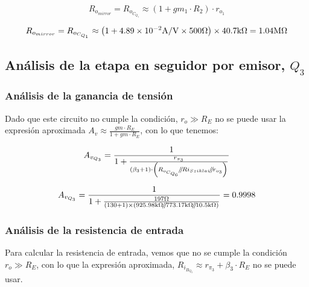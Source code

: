 \begin{equation}
R_{o_{mirror}} = R_{o_{C_{Q_{1}}}} \approx \left( 1 + gm_{1} \cdot R_{2} \right) \cdot r_{o_{1}}
\end{equation} 

\begin{equation*}
R_{o_{mirror}} = R_{o_{C_{Q_{1}}}} \approx \left( 1 + \num{4.89E-2} \si[per-mode=symbol]{\ampere\per\volt}  \times 500 \si[per-mode=symbol]{\ohm}  \right) \times 40.7 \si[per-mode=symbol]{\kilo\ohm} = 1.04 \si[per-mode=symbol]{\mega\ohm}
\end{equation*} 

\subsection{Análisis de la etapa en seguidor por emisor, $Q_{3}$}


\subsubsection{Análisis de la ganancia de tensión}

Dado que este circuito no cumple la condición, $r_{o} \gg R_{E}$ no se puede usar la expresión aproximada $A_{v} \approx \frac{gm \cdot R_{E}}{1 + gm \cdot R_{E}}$, con lo que tenemos:

\begin{equation}
A_{v_{Q_{3}}} = \frac{1}{1 + \frac{r_{\pi_{3}}}{  \left(  \beta_{3} + 1 \right) \cdot \left(  R_{o_{C_{Q_{6}}}} \parallelresistors R{i_{Sziklai}} \parallelresistors r_{o_{3}}  \right)  } }
\end{equation}

\begin{equation*}
A_{v_{Q_{3}}} = \frac{1}{1 + \frac { 197 \si[per-mode=symbol]{\ohm} }{  \left(  130 + 1 \right) \times \left(  925.98 \si[per-mode=symbol]{\kilo\ohm} \parallelresistors 773.17 \si[per-mode=symbol]{\kilo\ohm} \parallelresistors 10.5 \si[per-mode=symbol]{\kilo\ohm}  \right)  } } = 0.9998
\end{equation*}

\subsubsection{Análisis de la resistencia de entrada}


Para calcular la  resistencia de entrada, vemos que no se cumple la condición $r_{o} \gg R_{E}$, con lo que la expresión aproximada, $ R_{i_{B_{Q_{3}}}} \approx r_{\pi_{3}} + \beta_{3} \cdot R_{E}$ no se puede usar.\\ \\

